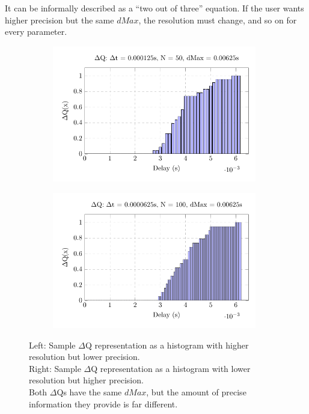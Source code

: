     It can be informally described as a ``two out of three'' equation. If the user wants higher precision but the same $dMax$, the resolution must change, and so on for every parameter.
        \begin{figure}[H]
            \centering
            \begin{subfigure}{.5\textwidth}
                \centering
                \includegraphics[width =0.98\textwidth]{tikz/hist_50.pdf}
                \label{fig:hist_50}
            \end{subfigure}%
            \begin{subfigure}{.5\textwidth}%
                \centering%
                \includegraphics[width =0.98\textwidth]{tikz/hist_100.pdf}%
                \label{fig:hist_100}%
            \end{subfigure}%
            \label{fig:hist_dmax}%
            \caption{Left: Sample $\Delta$Q representation as a histogram with higher resolution but lower precision. \\
            Right: Sample $\Delta$Q representation as a histogram with lower resolution but higher precision. \\
            Both $\Delta$Qs have the same $dMax$, but the amount of precise information they provide is far different.}
        \end{figure}%

